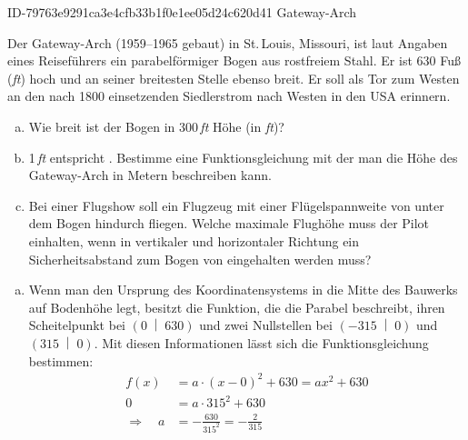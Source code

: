 \begin{exercise}
      {ID-79763e9291ca3e4cfb33b1f0e1ee05d24c620d41}
      {Gateway-Arch}
  \ifproblem\problem\par
    Der Gateway-Arch (1959--1965 gebaut) in St.\,Louis, Missouri, ist laut
    Angaben eines Reiseführers ein parabelförmiger Bogen aus rostfreiem
    Stahl. Er ist 630 Fuß (\emph{ft}) hoch und an seiner breitesten Stelle
    ebenso breit. Er soll als \glqq{}Tor zum Westen\grqq{} an den nach 1800
    einsetzenden Siedlerstrom nach Westen in den USA erinnern.
    \begin{enumerate}[a)]
      \item Wie breit ist der Bogen in 300\,\emph{ft} Höhe (in \emph{ft})?
      \item 1\,\emph{ft} entspricht . Bestimme eine
            Funktionsgleichung mit der man die Höhe des Gateway-Arch in Metern
            beschreiben kann.
      \item Bei einer Flugshow soll ein Flugzeug mit einer Flügelspannweite
            von  unter dem Bogen hindurch fliegen. Welche maximale
            Flughöhe muss der Pilot einhalten, wenn in vertikaler und horizontaler
            Richtung ein Sicherheitsabstand zum Bogen von  eingehalten
            werden muss?
    \end{enumerate}
  \fi
  \ifoutcome\outcome
    \begin{enumerate}[a)]
      \item Wenn man den Ursprung des Koordinatensystems
            in die Mitte des Bauwerks auf Bodenhöhe
            legt, besitzt die Funktion, die die Parabel
            beschreibt, ihren Scheitelpunkt bei
            $\left(0\;\middle|\;630\right)$ und zwei
            Nullstellen bei $\left(-315\;\middle|\;0\right)$
            und $\left(315\;\middle|\;0\right)$.
            Mit diesen Informationen lässt sich die
            Funktionsgleichung bestimmen:
            \begin{equation*}
              \begin{split}
                f(x)&=a\cdot(x-0)^2+630=ax^2+630
                \\
                0&=a\cdot315^2+630
                \\[1ex]
                \Rightarrow\quad
                a&=-\frac{630}{315^2}=-\frac{2}{315}
              \end{split}

\end{equation*}
\end{enumerate}
\end{exercise}
